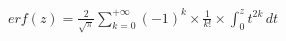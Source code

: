 \documentclass[preview]{standalone}
\begin{document}
\begin{align*}
erf(z) = { \frac{2}{\sqrt{\pi}} } \sum_{k=0}^{+\infty} (-1)^k \times \frac{1}{k!} \times \int_0^z { t^{2k} } \, dt
\end{align*}
\end{document}
